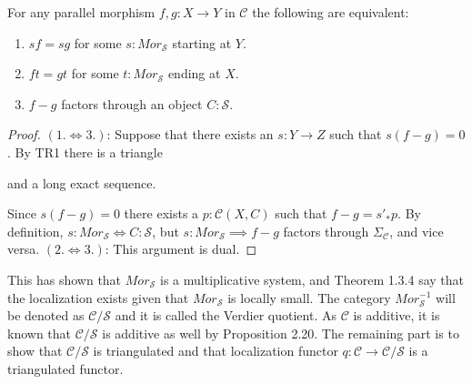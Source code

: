     \begin{prop}
        For any parallel morphism $f,g:X\rightarrow Y$ in $\mathcal{C}$ the following are equivalent:
        \begin{enumerate}
            \item $sf=sg$ for some $s:Mor_\mathcal{S}$ starting at $Y$.
            \item $ft=gt$ for some $t:Mor_\mathcal{S}$ ending at $X$.
            \item $f-g$ factors through an object $C:\mathcal{S}$.
        \end{enumerate}
    \end{prop}

    \begin{proof}
        $(1.\iff 3.)$:
        Suppose that there exists an $s:Y\rightarrow Z$ such that $s(f-g)=0$. By TR1 there is a triangle  and a long exact sequence.
        \begin{center}
        \end{center}
        Since $s(f-g)=0$ there exists a $p:\mathcal{C}(X,C)$ such that $f-g = s'_*p$. By definition, $s:Mor_\mathcal{S}\iff C:\mathcal{S}$, but $s:Mor_\mathcal{S}\implies f-g$ factors through $\Sigma_{\mathcal{C}}$, and vice versa.
        $(2.\iff 3.)$:
        This argument is dual.
    \end{proof}

    This has shown that $Mor_\mathcal{S}$ is a multiplicative system, and Theorem 1.3.4 say that the localization exists given that $Mor_\mathcal{S}$ is locally small. The category $Mor_\mathcal{S}^{-1}$ will be denoted as $\mathcal{C}/\mathcal{S}$ and it is called the Verdier quotient. As $\mathcal{C}$ is additive, it is known that $\mathcal{C}/\mathcal{S}$ is additive as well by Proposition 2.20. The remaining part is to show that $\mathcal{C}/\mathcal{S}$ is triangulated and that localization functor $q:\mathcal{C}\rightarrow \mathcal{C}/\mathcal{S}$ is a triangulated functor.


